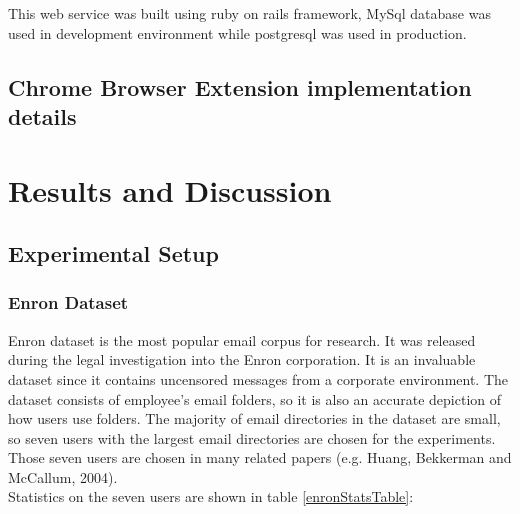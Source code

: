     This web service was built using ruby on rails \cite{ROR} framework, MySql database was used
    in development environment while postgresql was used in production.


\subsection{Chrome Browser Extension implementation details}

\section{Results and Discussion}
\label{sec:6_results_disscusion}
\subsection{Experimental Setup}

\subsubsection{Enron Dataset \cite{ENRON}}
Enron dataset is the most popular email corpus for research. It was released during the legal investigation into the Enron corporation.
It is an invaluable dataset since it contains uncensored messages from a corporate environment. The dataset consists of employee’s email folders, so it is also an accurate depiction of how users use folders. The majority of email directories in the dataset are small, so seven users with the largest email directories are chosen for the experiments. Those seven users are chosen in many related papers (e.g. Huang, Bekkerman and McCallum, 2004\cite{RON04}). \\Statistics on the seven users are shown in table \ref{enronStatsTable}:

